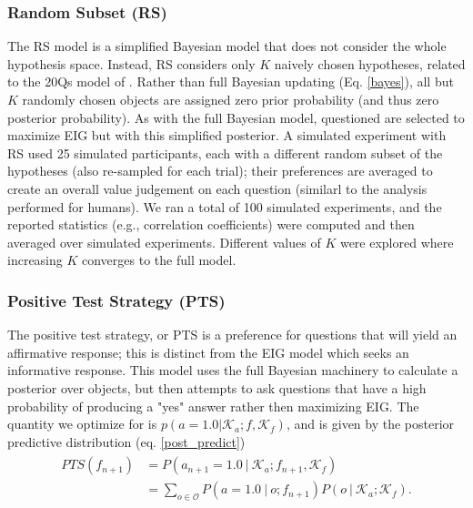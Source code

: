 \documentclass[11pt,letterpaper]{article}
\newcommand{\mc}[1]{\mathcal{#1}}
\newcommand\mynotes[1]{\textcolor{red}{#1}}
\begin{document}
\subsubsection*{Random Subset (RS)}
The RS model is a simplified Bayesian model that does not consider the whole hypothesis space.
Instead, RS considers only $K$ naively chosen hypotheses, related to the 20Qs model of \cite{Navarro2011}.
Rather than full Bayesian updating (Eq.
\ref{bayes}), all but $K$ randomly chosen objects are assigned zero prior probability (and thus zero posterior probability).
As with the full Bayesian model, questioned are selected to maximize EIG but with this simplified posterior.
A simulated experiment with RS used 25 simulated participants, each with a different random subset of the hypotheses (also re-sampled for each trial); their preferences are averaged to create an overall value judgement on each question (similarl to the analysis performed for humans).
We ran a total of 100 simulated experiments, and the reported statistics (e.g., correlation coefficients) were computed and then averaged over simulated experiments.
Different values of $K$ were explored where increasing $K$ converges to the full model.

\subsubsection*{Positive Test Strategy (PTS)}
The positive test strategy, or PTS is a preference for questions that will yield an affirmative response; this is distinct from the EIG model which seeks an informative response.
This model uses the full Bayesian machinery to calculate a posterior over objects, but then attempts to ask questions that have a high probability of producing a "yes" answer rather then maximizing EIG. The quantity we optimize for is $p(a=1.0 | \mc{K}_a; f, \mc{K}_f)$, and is given by the posterior predictive distribution (eq. \ref{post_predict})
\begin{align} \label{pts}
\begin{split}
PTS (f_{n+1}) &= P(a_{n+1} = 1.0\ |\ \mc{K}_a; f_{n+1}, \mc{K}_f) \\
&= \sum_{o \in \mc{O}} P(a = 1.0\ |\ o; f_{n+1}) P(o\ |\ \mc{K}_a; \mc{K}_f).
\end{split}
\end{align}

\end{document}
